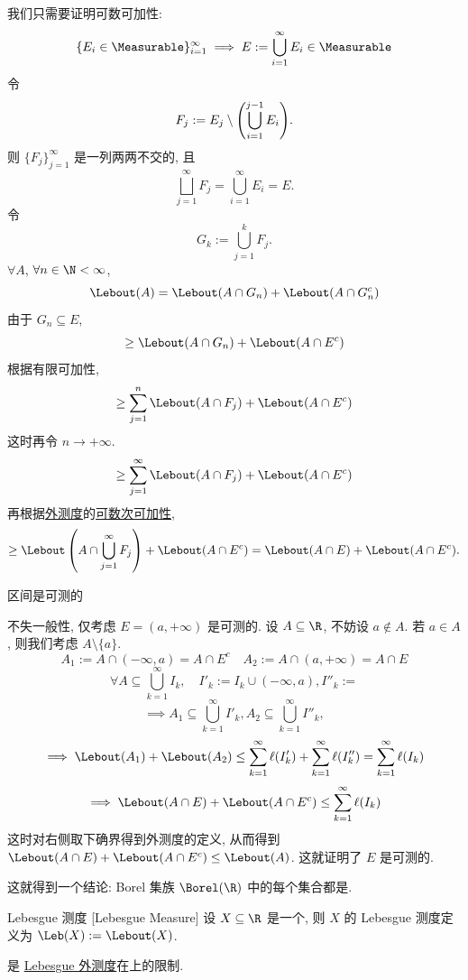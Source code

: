 \begin{prf}
    我们只需要证明可数可加性: 
    \[\{E_i\in\Measurable\}_{i=1}^\infty\implies E:=\bigcup_{i=1}^\infty E_i\in\Measurable\]
    令
    \[F_j:=E_j\setminus \qty(\bigcup_{i=1}^{j-1}E_i).\]
    则 \(\{F_j\}_{j=1}^\infty\) 是一列两两不交的\MeasurableSet{}, 且 
    \[\bigsqcup_{j=1}^\infty F_j = \bigcup_{i=1}^\infty E_i=E.\]
    令
    \[G_k:=\bigcup_{j=1}^{k}F_j.\]
    \(\forall A\), \(\forall n\in\N<\infty\),
    \[\Lebout(A)=\Lebout(A\cap G_n)+\Lebout(A\cap G_n^c)\]
    由于 \(G_n\subseteq E\),
    \[\geq\Lebout(A\cap G_n)+\Lebout(A\cap E^c)\]
    根据有限可加性,
    \[\geq\sum_{j=1}^{n}\Lebout(A\cap F_j)+\Lebout(A\cap E^c)\]
    这时再令 \(n\to+\infty\).
    \[\geq\sum_{j=1}^{\infty}\Lebout(A\cap F_j)+\Lebout(A\cap E^c)\]
    再根据\hyperref[dfn:lebesgue-outer-measure]{外测度}的\hyperref[ppt:lebesgue-outer-measure-countable-subadditivity]{可数次可加性},
    \[\geq\Lebout\left(A\cap\bigcup_{j=1}^{\infty}F_j\right)+\Lebout(A\cap E^c)=\Lebout(A\cap E)+\Lebout(A\cap E^c).\]
\end{prf}
\begin{ppt}
    {区间是可测的}
\end{ppt}
\begin{prf}
    不失一般性, 仅考虑 $E=(a,+\infty)$ 是可测的. 设 \(A\subseteq\R\), 不妨设 \(a\notin A\). 若 \(a\in A\), 则我们考虑 \(A\setminus\{a\}\). 
    \[A_1:=A\cap (-\infty,a)=A\cap E^c\quad A_2:=A\cap (a,+\infty)=A\cap E\]
    \[\forall A\subseteq\bigcup_{k=1}^{\infty}I_k, \quad I'_k:=I_k\cup(-\infty,a), I''_k:= \]
    \[\implies A_1\subseteq\bigcup_{k=1}^{\infty}I'_k, A_2\subseteq\bigcup_{k=1}^{\infty}I''_k,\]
    \[\implies \Lebout(A_1)+\Lebout(A_2)\leq\sum_{k=1}^{\infty}\ell(I'_k)+\sum_{k=1}^{\infty}\ell(I''_k)=\sum_{k=1}^{\infty}\ell(I_k)\]
    \[\implies \Lebout(A\cap E)+\Lebout(A\cap E^c)\leq\sum_{k=1}^{\infty}\ell(I_k)\]
    这时对右侧取下确界得到外测度的定义, 从而得到 \(\Lebout(A\cap E)+\Lebout(A\cap E^c)\leq\Lebout(A)\). 这就证明了 \(E\) 是可测的.
\end{prf}
\begin{rmk}
    这就得到一个结论: Borel 集族 \(\Borel(\R)\) 中的每个集合都是\MeasurableSet{}. 
\end{rmk}
\begin{dfn}
    {Lebesgue 测度}
    [Lebesgue Measure]
    设 \(X\subseteq\R\) 是一个\MeasurableSet{}, 则 \(X\) 的 Lebesgue 测度定义为 \(\Leb(X) := \Lebout(X)\).
\end{dfn}
\begin{rmk}
    \Lebesguem{}是 \hyperref[dfn:lebesgue-outer-measure]{Lebesgue 外测度}在\MeasurableSet{}上的限制. 
\end{rmk}
